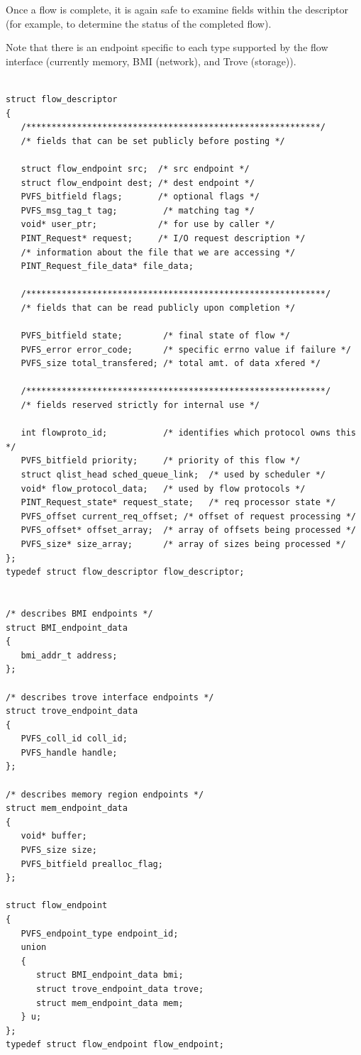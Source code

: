 \documentclass[12pt]{article} %
\begin{document}
Once a flow is complete, it is again safe to examine fields within
the descriptor (for example, to determine the status of the
completed flow).

Note that there is an endpoint specific to each type supported by
the flow interface (currently memory, BMI (network), and Trove
(storage)).

\begin{verbatim}

struct flow_descriptor
{
   /**********************************************************/
   /* fields that can be set publicly before posting */

   struct flow_endpoint src;  /* src endpoint */
   struct flow_endpoint dest; /* dest endpoint */
   PVFS_bitfield flags;       /* optional flags */
   PVFS_msg_tag_t tag;         /* matching tag */
   void* user_ptr;            /* for use by caller */
   PINT_Request* request;     /* I/O request description */
   /* information about the file that we are accessing */
   PINT_Request_file_data* file_data;  

   /***********************************************************/
   /* fields that can be read publicly upon completion */

   PVFS_bitfield state;        /* final state of flow */
   PVFS_error error_code;      /* specific errno value if failure */
   PVFS_size total_transfered; /* total amt. of data xfered */

   /***********************************************************/
   /* fields reserved strictly for internal use */

   int flowproto_id;           /* identifies which protocol owns this */
   PVFS_bitfield priority;     /* priority of this flow */
   struct qlist_head sched_queue_link;  /* used by scheduler */
   void* flow_protocol_data;   /* used by flow protocols */
   PINT_Request_state* request_state;   /* req processor state */
   PVFS_offset current_req_offset; /* offset of request processing */
   PVFS_offset* offset_array;  /* array of offsets being processed */
   PVFS_size* size_array;      /* array of sizes being processed */
};
typedef struct flow_descriptor flow_descriptor;


/* describes BMI endpoints */
struct BMI_endpoint_data
{
   bmi_addr_t address;
};

/* describes trove interface endpoints */
struct trove_endpoint_data
{
   PVFS_coll_id coll_id;
   PVFS_handle handle;
};

/* describes memory region endpoints */
struct mem_endpoint_data
{
   void* buffer;
   PVFS_size size;
   PVFS_bitfield prealloc_flag;
};

struct flow_endpoint
{
   PVFS_endpoint_type endpoint_id;
   union
   {
      struct BMI_endpoint_data bmi;
      struct trove_endpoint_data trove;
      struct mem_endpoint_data mem;
   } u;
};
typedef struct flow_endpoint flow_endpoint;

\end{verbatim}
\end{document}
